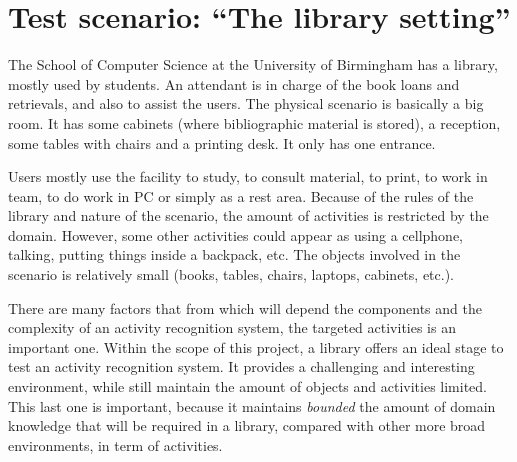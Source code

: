 

\section{Test scenario: ``The library setting''} \label{sec_Library} %

The School of Computer Science at the University of Birmingham has a library, mostly used by students.
An attendant is in charge of the book loans and retrievals, and also to assist the users.
The physical scenario is basically a big room. It has some cabinets (where bibliographic material is stored), a reception, some tables with chairs and a printing desk. It only has one entrance.

Users mostly use the facility to study, to consult material, to print, to work in team, to do work in PC or simply as a rest area.
Because of the rules of the library and nature of the scenario, the amount of activities is restricted by the domain.
However, some other activities could appear as using a cellphone, talking, putting things inside a backpack, etc.
The objects involved in the scenario is relatively small (books, tables, chairs, laptops, cabinets, etc.).

There are many factors that from which will depend the components and the complexity of an activity recognition system, the targeted activities is an important one.
Within the scope of this project, a library offers an ideal stage to test an activity recognition system.
It provides a challenging and interesting environment, while still maintain the amount of objects and activities limited.
This last one is important, because it maintains \textit{bounded} the amount of domain knowledge that will be required in a library, compared with other more broad environments, in term of activities.







